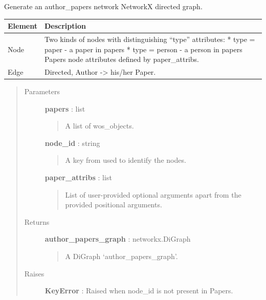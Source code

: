 \documentclass[letterpaper,10pt,english]{sphinxmanual}
\begin{document}

\begin{fulllineitems}
\label{tethne.networks.authors:tethne.networks.authors.author_papers}
Generate an author\_papers network NetworkX directed graph.

\begin{tabulary}{\linewidth}{|L|L|}
\hline
\textsf{\relax 
Element
} & \textsf{\relax 
Description
}\\
\hline
Node
 & 
Two kinds of nodes with distinguishing ``type'' attributes:
* type = paper    - a paper in papers
* type = person   - a person in papers
Papers node attributes defined by paper\_attribs.
\\

Edge
 & 
Directed, Author -\textgreater{} his/her Paper.
\\
\hline\end{tabulary}

\begin{quote}\begin{description}
\item[{Parameters}] \leavevmode
\textbf{papers} : list
\begin{quote}

A list of wos\_objects.
\end{quote}

\textbf{node\_id} : string
\begin{quote}

A key from {\hyperref[tethne.classes.paper:tethne.classes.paper.Paper]{}} used to identify the nodes.
\end{quote}

\textbf{paper\_attribs} : list
\begin{quote}

List of user-provided optional arguments apart from the provided
positional arguments.
\end{quote}

\item[{Returns}] \leavevmode
\textbf{author\_papers\_graph} : networkx.DiGraph
\begin{quote}

A DiGraph `author\_papers\_graph'.
\end{quote}

\item[{Raises}] \leavevmode
\textbf{KeyError} : Raised when node\_id is not present in Papers.

\end{description}\end{quote}

\end{fulllineitems}
\end{document}
